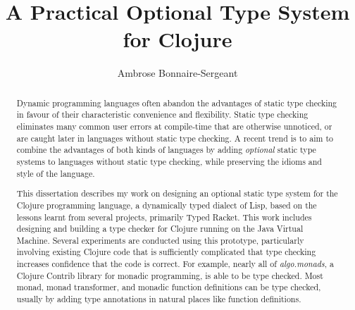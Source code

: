 \documentclass{cshonours}
\title{A Practical Optional Type System for Clojure}
\author{Ambrose Bonnaire-Sergeant}
\begin{document}
\maketitle

\begin{abstract}

%
%

Dynamic programming languages often abandon the advantages of static type checking 
in favour of their characteristic convenience and flexibility.
Static type checking eliminates many common user errors at compile-time that
are otherwise unnoticed, or are caught later in languages without static type checking.
A recent trend is to aim to combine the advantages of both kinds of languages by adding \emph{optional} static 
type systems to languages without static type checking, while preserving the idioms and style of the language.

This dissertation describes my work on designing an optional static type system for the Clojure programming language,
a dynamically typed dialect of Lisp, based on
the lessons learnt from several projects, primarily Typed Racket.
This work includes designing and building a type checker for Clojure running on the Java Virtual Machine.
Several experiments are conducted using this prototype, particularly involving
existing Clojure code that is sufficiently complicated that
type checking increases confidence that the code is correct.
For example, nearly all of \emph{algo.monads}, a Clojure Contrib library for monadic programming, 
is able to be type checked.
Most monad, monad transformer, and monadic function definitions can be type checked,
usually by adding type annotations in natural places like function definitions.


\end{abstract}
\end{document}
